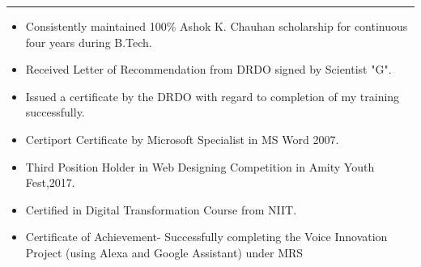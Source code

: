 \documentclass[a4paper,10pt]{article}
\newlength{\cvcolumngapwidth}
\newlength{\cvleftcolumnwidth}
\newlength{\cvrightcolumnwidth}
\newcommand{\cvsectionstyle}[1]{{\normalsize\cvsectionfont\textcolor{cvsectioncolor}{#1}}}
\newcommand{\cvheadingstyle}[1]{{\normalsize\cvheadingfont\textcolor{cvheadingcolor}{#1}}}
\newlength{\cvafteritemskipamount}
\newlength{\cvaftersectionskipamount}
\newlength{\cvbetweensectionandheadingextraskipamount}
\newlength{\cvparskip}
\newcommand{\cvsection}[1]{
    \begin{minipage}[t]{\cvleftcolumnwidth}
        \raggedleft\cvsectionstyle{#1}
    \end{minipage}%
    \hspace{\cvcolumngapwidth}%
    \begin{minipage}[t]{\cvrightcolumnwidth}
        \textcolor{cvrulecolor}{\rule{\cvrightcolumnwidth}{0.3mm}}
    \end{minipage}

    \vspace{\cvaftersectionskipamount}
}
\newcommand{\cvitem}[2]{
    \begin{minipage}[t]{\cvleftcolumnwidth}
        \raggedleft #1
    \end{minipage}%
    \hspace{\cvcolumngapwidth}%
    \begin{minipage}[t]{\cvrightcolumnwidth}
        \setlength{\parskip}{\cvparskip} #2
    \end{minipage}

    \vspace{\cvafteritemskipamount}
}
\begin{document}

\cvsection{Achievements}

\vspace{\cvbetweensectionandheadingextraskipamount}

\cvitem{
    \cvheadingstyle{}
}{
     \begin{itemize}
        \item Consistently maintained 100\% Ashok K. Chauhan scholarship for continuous four years during B.Tech.
     \item Received Letter of Recommendation from DRDO signed by Scientist "G".
 \item Issued a certificate by the DRDO with regard to completion of my training successfully.
 \item Certiport Certificate by Microsoft Specialist in MS Word 2007.
 \item Third Position Holder in Web Designing Competition in Amity Youth Fest,2017.
 \item Certified in Digital Transformation Course from NIIT.
 \item Certificate of Achievement- Successfully completing the Voice Innovation Project (using Alexa and Google Assistant) under MRS

    \end{itemize}
}
\end{document}
